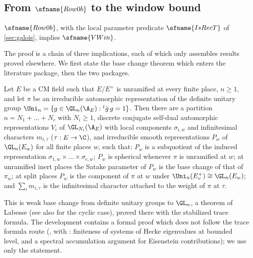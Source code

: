 \subsection{From \texorpdfstring{$\sfname{Row0b}$}{Row0b} to the window bound}\label{sec:pf:vwin:top}

\begin{theorem}\label{pf:vwin:main}
$\sfname{Row0b}$, with the local parameter predicate $\sfname{IsRecT}$ of \cref{sec:galois}, implies $\sfname{VWin}$.
\end{theorem}

The proof is a chain of three implications, each of which only assembles results proved elsewhere. We first state the
base change theorem which enters the literature package, then the two packages.

\begin{theorem}\label{pf:vwin:bc}
Let $E$ be a CM field such that $E/E^+$ is unramified at every finite place, $n\ge1$, and let $\pi$ be an
irreducible automorphic representation of the definite unitary group $\Uni_n=\{g\in\GL_n(\A_E):{}^t\bar g\,g=1\}$.
Then there are a partition $n=N_1+\dots+N_c$ with $N_i\ge1$, discrete conjugate self-dual automorphic representations
$V_i$ of $\GL_{N_i}(\A_E)$ with local components $\sigma_{i,w}$ and infinitesimal characters $m_{i,\tau}$
($\tau:E\to\C$), and irreducible smooth representations $P_w$ of $\GL_n(E_w)$ for all finite places $w$, such that:
$P_w$ is a subquotient of the induced representation $\sigma_{1,w}\times\dots\times\sigma_{c,w}$; $P_w$ is spherical
whenever $\pi$ is unramified at $w$; at unramified inert places the Satake parameter of $P_w$ is the base change of that
of $\pi_w$; at split places $P_w$ is the component of $\pi$ at $w$ under $\Uni_n(E^+_v)\cong\GL_n(E_w)$; and
$\sum_im_{i,\tau}$ is the infinitesimal character attached to the weight of $\pi$ at $\tau$.
\end{theorem}

This is weak base change from definite unitary groups to $\GL_n$, a theorem of Labesse \cite{Labesse2011} (see also
\cite{ArthurClozel1989} for the cyclic case), proved there with the stabilized trace formula. The development
contains a formal proof which does not follow the trace formula route
(, with :
finiteness of systems of Hecke eigenvalues at bounded level, and a spectral accumulation argument for Eisenstein
contributions); we use only the statement.

